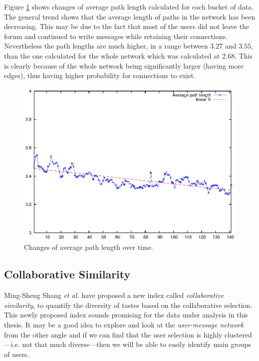     Figure \ref{fig:avg_path} shows changes of average path length calculated for each bucket of data. The general trend shows that the average length of paths in the network has been decreasing. This may be due to the fact that most of the users did not leave the forum and continued to write messages while retaining their connections. Nevertheless the path lengths are much higher, in a range between $3.27$ and $3.55$, than the one calculated for the whole network which was calculated at $2.68$. This is clearly because of the whole network being significantly larger (having more edges), thus having higher probability for connections to exist.
    \begin{figure}[H]
      \centering
      \includegraphics[width=\textwidth]{chapters/03_implementation/avg_path}
      \caption{Changes of average path length over time.}
      \label{fig:avg_path}
    \end{figure}

  \subsection{Collaborative Similarity}
    
    Ming-Sheng Shang \textit{et al.} have proposed a new index called \emph{collaborative similarity}, to quantify the diversity of tastes based on the collaborative selection\cite{Shang2010}. This newly proposed index sounds promising for the data under analysis in this thesis. It may be a good idea to explore and look at the \emph{user-message network} from the other angle and if we can find that the user selection is highly clustered---i.e. not that much diverse---then we will be able to easily identify main groups of users.
    
